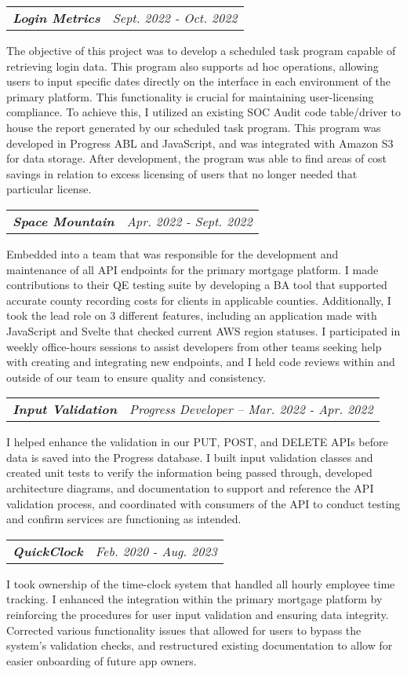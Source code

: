 \documentclass[letterpaper,11pt]{article}
\makeatletter
\newcommand{\resumeItemWithDate}[2]{
    \item
    \begin{tabular*}{0.97\textwidth}{l@{\extracolsep{\fill}}r}
      \textit{\small#1} & \textit{\small #2} \\
    \end{tabular*}\vspace{2pt}
}
\makeatother
\begin{document}
        \resumeItemWithDate
          {\textbf{Login Metrics}}{Sept. 2022 - Oct. 2022}
            {The objective of this project was to develop a scheduled task program capable of retrieving login data. This program also supports ad hoc operations, 
            allowing users to input specific dates directly on the interface in each environment of the primary platform. This functionality is crucial for maintaining
            user-licensing compliance. To achieve this, I utilized an existing SOC Audit code table/driver to house the report generated by our scheduled task program.
            This program was developed in Progress ABL and JavaScript, and was integrated with Amazon S3 for data storage. After development, the program was 
            able to find areas of cost savings in relation to excess licensing of users that no longer needed that particular license.}
        \resumeItemWithDate
          {\textbf{Space Mountain}}{Apr. 2022 - Sept. 2022}
            {Embedded into a team that was responsible for the development and maintenance of all API endpoints for the primary mortgage platform. I made contributions
            to their QE testing suite by developing a BA tool that supported accurate county recording costs for clients in applicable counties. Additionally, I took the
            lead role on 3 different features, including an application made with JavaScript and Svelte that checked current AWS region statuses. I participated in weekly 
            office-hours sessions to assist developers from other teams seeking help with creating and integrating new endpoints, and I held code reviews within and outside
            of our team to ensure quality and consistency.}  
        \resumeItemWithDate
          {\textbf{Input Validation}}{Progress Developer -- Mar. 2022 - Apr. 2022}
            {I helped enhance the validation in our PUT, POST, and DELETE APIs before data is saved into the Progress database. I built input validation classes and created
            unit tests to verify the information being passed through, developed architecture diagrams, and documentation to support and reference the API validation process, 
            and coordinated with consumers of the API to conduct testing and confirm services are functioning as intended.}
        \resumeItemWithDate
          {\textbf{QuickClock}}{Feb. 2020 - Aug. 2023}
            {I took ownership of the time-clock system that handled all hourly employee time tracking. I enhanced the integration within the primary mortgage platform by
            reinforcing the procedures for user input validation and ensuring data integrity. Corrected various functionality issues that allowed for users to bypass the system's
            validation checks, and restructured existing documentation to allow for easier onboarding of future app owners.}
\end{document}
